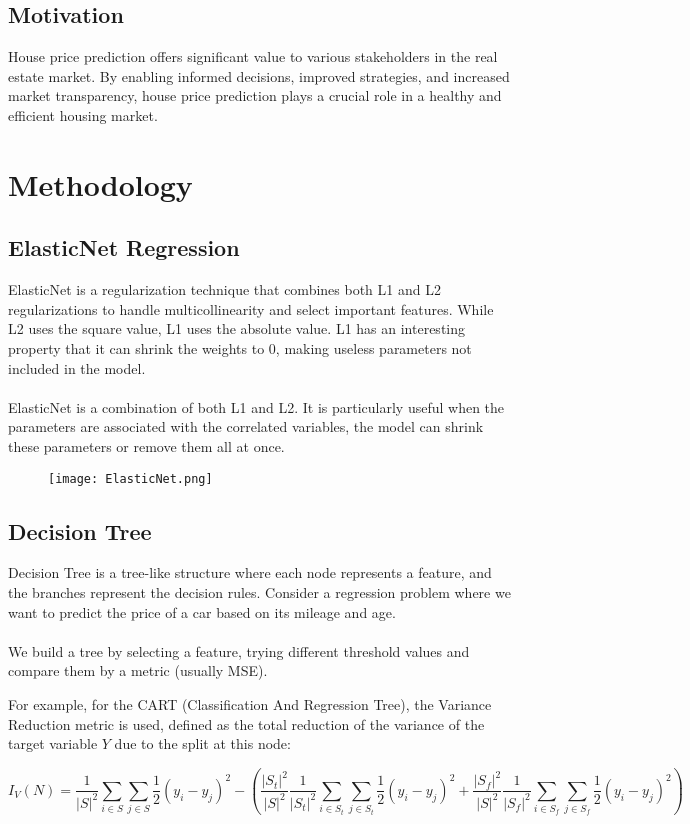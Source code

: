 \documentclass[a4paper, 12pt]{article}
\begin{document}
\subsection{Motivation}
House price prediction offers significant value to various stakeholders in the real estate market. By enabling informed decisions, improved strategies, and increased market transparency, house price prediction plays a crucial role in a healthy and efficient housing market.
\section{Methodology}
\subsection{ElasticNet Regression}
ElasticNet is a regularization technique that combines both L1 and L2 regularizations to handle multicollinearity and select important features.
While L2 uses the square value, L1 uses the absolute value. L1 has an interesting property that it can shrink the weights to 0, making useless parameters not included in the model.\\\\
ElasticNet is a combination of both L1 and L2. It is particularly useful when the parameters are associated with the correlated variables, the model can shrink these parameters or remove them all at once.
\begin{figure}[tbh]
    \centering
    \texttt{[image: ElasticNet.png]}
\end{figure}
\newpage
\subsection{Decision Tree}
Decision Tree is a tree-like structure where each node represents a feature, and the branches represent the decision rules. Consider a regression problem where we want to predict the price of a car based on its mileage and age.\\\\
We build a tree by selecting a feature, trying different threshold values and compare them by a metric (usually MSE). 

For example, for the CART (Classification And Regression Tree), the Variance Reduction metric is used, defined as the total reduction of the variance of the target variable $Y$ due to the split at this node: 

\begin{equation}
I_V(N) = \frac{1}{|S|^2} \sum_{i \in S} \sum_{j \in S} \frac{1}{2} (y_i - y_j)^2 -
\left(
\frac{|S_t|^2}{|S|^2} \frac{1}{|S_t|^2} \sum_{i \in S_t} \sum_{j \in S_t} \frac{1}{2} (y_i - y_j)^2 +
\frac{|S_f|^2}{|S|^2} \frac{1}{|S_f|^2} \sum_{i \in S_f} \sum_{j \in S_f} \frac{1}{2} (y_i - y_j)^2
\right)
\end{equation}
\end{document}

